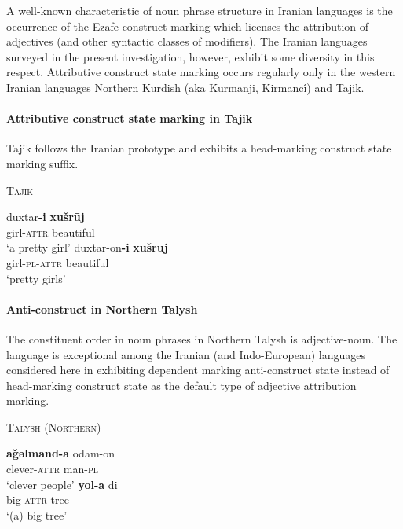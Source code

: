 \noindent A well-known characteristic of noun phrase structure in Iranian languages is the occurrence of the Ezafe construct marking which licenses the attribution of adjectives (and other syntactic classes of modifiers). The Iranian languages surveyed in the present investigation, however, exhibit some diversity in this respect. Attributive construct state marking occurs regularly only in the western Iranian languages Northern Kurdish (aka Kurmanji, Kirmancî) and Tajik.

\paragraph{Attributive construct state marking in Tajik}
Tajik follows the Iranian prototype and exhibits a head-marking construct state marking suffix.
\begin{exe}
\ex \textsc{Tajik} \citep{rastorgueva1963}
\begin{xlist}
\ex
\gll	duxtar\textbf{-i} \textbf{xušrūj}\\
	girl-\textsc{attr} beautiful\\
\glt	‘a pretty girl’
\ex
\gll	duxtar-on\textbf{-i} \textbf{xušrūj}\\
	girl-\textsc{pl}-\textsc{attr} beautiful\\
\glt	‘pretty girls’
\end{xlist}
\end{exe}

\paragraph{Anti-construct in Northern Talysh} \label{talysh synchr}
The constituent order in noun phrases in Northern Talysh is adjective-noun. The language is exceptional among the Iranian (and Indo-European) languages considered here in exhibiting dependent marking anti-construct state instead of head-marking construct state as the default type of adjective attribution marking.
\begin{exe}
\ex \textsc{Talysh (Northern)} \cite[27]{schulze2000}%
\begin{xlist}
\ex
\gll	\textbf{āğəlmānd-a} odam-on\\
	clever-\textsc{attr} man-\textsc{pl}\\
\glt	‘clever people’
\ex
\gll	\textbf{yol-a} di\\
	big-\textsc{attr} tree\\
\glt	‘(a) big tree’
\end{xlist}
\end{exe}

